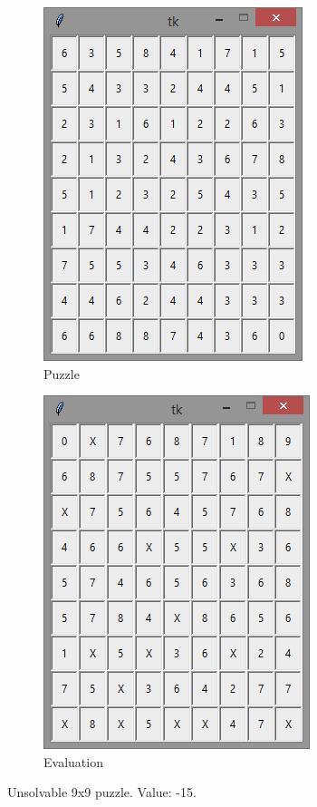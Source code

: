 \documentclass[12pt]{article}
\begin{document}
\begin{figure}[H]
	\begin{subfigure}{.5\textwidth}
		\centering
     		\includegraphics[width = .6\linewidth]{9x9_puzzle_-15}
     		\caption{Puzzle}
     		\label{fig7:sfig1}
	\end{subfigure}
	\begin{subfigure}{.5\textwidth}
		\centering
		\includegraphics[width = .6\linewidth]{9x9_eval_-15}
		\caption{Evaluation}
		\label{fig7:sfig2}
	\end{subfigure}
\caption{Unsolvable 9x9 puzzle. Value: -15.}
\label{fig:9x9bad}
\end{figure}
\end{document}
